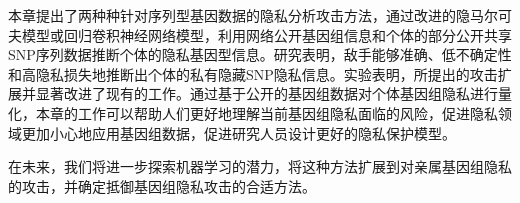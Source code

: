 本章提出了两种种针对序列型基因数据的隐私分析攻击方法，通过改进的隐马尔可夫模型或回归卷积神经网络模型，利用网络公开基因组信息和个体的部分公开共享SNP序列数据推断个体的隐私基因型信息。研究表明，敌手能够准确、低不确定性和高隐私损失地推断出个体的私有隐藏SNP隐私信息。实验表明，所提出的攻击扩展并显著改进了现有的工作。通过基于公开的基因组数据对个体基因组隐私进行量化，本章的工作可以帮助人们更好地理解当前基因组隐私面临的风险，促进隐私领域更加小心地应用基因组数据，促进研究人员设计更好的隐私保护模型。

在未来，我们将进一步探索机器学习的潜力，将这种方法扩展到对亲属基因组隐私的攻击，并确定抵御基因组隐私攻击的合适方法。